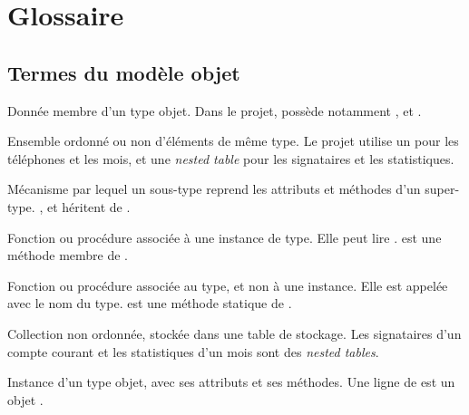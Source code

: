 \chapter{Glossaire}
\label{ann:glossaire}

\section{Termes du modèle objet}

\begin{description}[leftmargin=2.6em,style=nextline]

\item[Attribut objet.]
Donnée membre d'un type objet. Dans le projet,  possède
notamment ,  et .

\item[Collection.]
Ensemble ordonné ou non d'éléments de même type. Le projet utilise un
 pour les téléphones et les mois, et une \emph{nested table} pour
les signataires et les statistiques.

\item[Héritage.]
Mécanisme par lequel un sous-type reprend les attributs et méthodes d'un
super-type. ,  et
 héritent de .

\item[Méthode membre.]
Fonction ou procédure associée à une instance de type. Elle peut lire
.  est une méthode membre de
.

\item[Méthode statique.]
Fonction ou procédure associée au type, et non à une instance. Elle est appelée
avec le nom du type.  est une méthode statique de
.

\item[Nested table.]
Collection non ordonnée, stockée dans une table de stockage. Les signataires
d'un compte courant et les statistiques d'un mois sont des \emph{nested
tables}.

\item[Objet.]
Instance d'un type objet, avec ses attributs et ses méthodes. Une ligne de
 est un objet .


\end{description}

